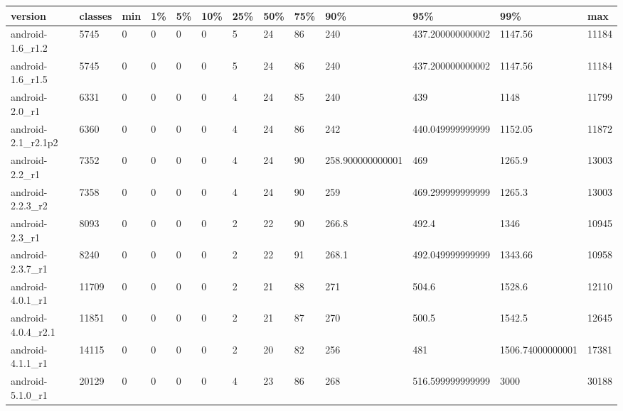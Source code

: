 \begin{tabular}{|l|l|l|l|l|l|l|l|l|l|l|l|l|}
\hline
version&classes&min&1\%&5\%&10\%&25\%&50\%&75\%&90\%&95\%&99\%&max\\
\hline
android-1.6\_r1.2&5745&0&0&0&0&5&24&86&240&437.200000000002&1147.56&11184\\
\hline
android-1.6\_r1.5&5745&0&0&0&0&5&24&86&240&437.200000000002&1147.56&11184\\
\hline
android-2.0\_r1&6331&0&0&0&0&4&24&85&240&439&1148&11799\\
\hline
android-2.1\_r2.1p2&6360&0&0&0&0&4&24&86&242&440.049999999999&1152.05&11872\\
\hline
android-2.2\_r1&7352&0&0&0&0&4&24&90&258.900000000001&469&1265.9&13003\\
\hline
android-2.2.3\_r2&7358&0&0&0&0&4&24&90&259&469.299999999999&1265.3&13003\\
\hline
android-2.3\_r1&8093&0&0&0&0&2&22&90&266.8&492.4&1346&10945\\
\hline
android-2.3.7\_r1&8240&0&0&0&0&2&22&91&268.1&492.049999999999&1343.66&10958\\
\hline
android-4.0.1\_r1&11709&0&0&0&0&2&21&88&271&504.6&1528.6&12110\\
\hline
android-4.0.4\_r2.1&11851&0&0&0&0&2&21&87&270&500.5&1542.5&12645\\
\hline
android-4.1.1\_r1&14115&0&0&0&0&2&20&82&256&481&1506.74000000001&17381\\
\hline
android-5.1.0\_r1&20129&0&0&0&0&4&23&86&268&516.599999999999&3000&30188\\
\hline
\end{tabular}
